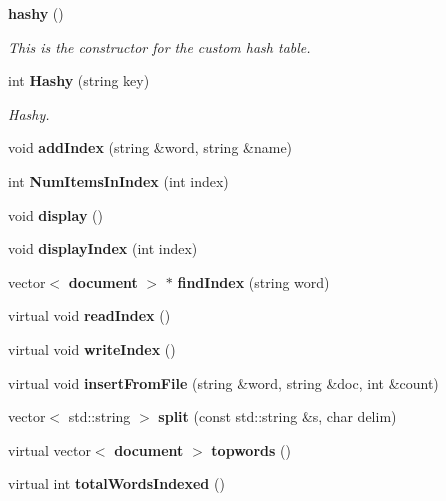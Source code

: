 \begin{DoxyCompactItemize}
\item 
{\bf hashy} ()\label{classhashy_ab050f001c1a89c1e15fb1739626c8951}

\begin{DoxyCompactList}\small\item\em This is the constructor for the custom hash table. \end{DoxyCompactList}\item 
int {\bf Hashy} (string key)
\begin{DoxyCompactList}\small\item\em Hashy. \end{DoxyCompactList}\item 
void {\bfseries add\+Index} (string \&word, string \&name)\label{classhashy_ab6e0bf2ad21ff3ecfb313fdb0ad5c8f0}

\item 
int {\bfseries Num\+Items\+In\+Index} (int index)\label{classhashy_aeeb63d39a0c003a2a9b8c21dc6025621}

\item 
void {\bfseries display} ()\label{classhashy_aa45c52806c5d41632dfd06f981d2f077}

\item 
void {\bfseries display\+Index} (int index)\label{classhashy_a4d6553a650fa179be75d43d6bf0937a8}

\item 
vector$<$ {\bf document} $>$ $\ast$ {\bfseries find\+Index} (string word)\label{classhashy_a1896f27d06ef1312b49d6756b7df9886}

\item 
virtual void {\bfseries read\+Index} ()\label{classhashy_a967409a70ff79b9e327bd199144ff974}

\item 
virtual void {\bfseries write\+Index} ()\label{classhashy_a9eee50b1514d733aad262ae74b190121}

\item 
virtual void {\bfseries insert\+From\+File} (string \&word, string \&doc, int \&count)\label{classhashy_a83616aa2459834e846439b8c11895a6a}

\item 
vector$<$ std\+::string $>$ {\bfseries split} (const std\+::string \&s, char delim)\label{classhashy_a5241877dd707ededf7023bae50fa17d6}

\item 
virtual vector$<$ {\bf document} $>$ {\bfseries topwords} ()\label{classhashy_adbe9acb0d7ab3caaf956f61b1f93bb2c}

\item 
virtual int {\bfseries total\+Words\+Indexed} ()\label{classhashy_ab763dc0125d94ed8f54bc83c8821f71e}

\end{DoxyCompactItemize}


